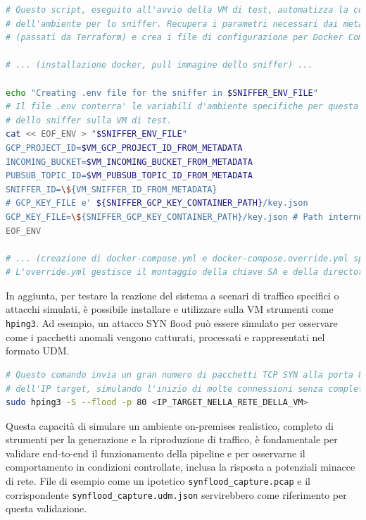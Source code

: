 \documentclass[11pt, a4paper]{article}
\begin{document}
\begin{lstlisting}[language=bash, style=bashstyle, caption={Estratto da \texttt{terraform/modules/test\_generator\_vm/startup\_script\_vm.sh}.}, label=lst:tf_vm_startup, basicstyle=\ttfamily\scriptsize]
# Questo script, eseguito all'avvio della VM di test, automatizza la configurazione
# dell'ambiente per lo sniffer. Recupera i parametri necessari dai metadati dell'istanza
# (passati da Terraform) e crea i file di configurazione per Docker Compose.

# ... (installazione docker, pull immagine dello sniffer) ...

echo "Creating .env file for the sniffer in $SNIFFER_ENV_FILE"
# Il file .env conterra' le variabili d'ambiente specifiche per questa istanza
# dello sniffer sulla VM di test.
cat << EOF_ENV > "$SNIFFER_ENV_FILE"
GCP_PROJECT_ID=$VM_GCP_PROJECT_ID_FROM_METADATA
INCOMING_BUCKET=$VM_INCOMING_BUCKET_FROM_METADATA
PUBSUB_TOPIC_ID=$VM_PUBSUB_TOPIC_ID_FROM_METADATA
SNIFFER_ID=\${VM_SNIFFER_ID_FROM_METADATA}
# GCP_KEY_FILE e' ${SNIFFER_GCP_KEY_CONTAINER_PATH}/key.json
GCP_KEY_FILE=\${SNIFFER_GCP_KEY_CONTAINER_PATH}/key.json # Path interno al container
EOF_ENV

# ... (creazione di docker-compose.yml e docker-compose.override.yml specifici per la VM) ...
# L'override.yml gestisce il montaggio della chiave SA e della directory delle catture.
\end{lstlisting}
In aggiunta, per testare la reazione del sistema a scenari di traffico specifici o attacchi simulati, è possibile installare e utilizzare sulla VM strumenti come \texttt{hping3}. Ad esempio, un attacco SYN flood può essere simulato per osservare come i pacchetti anomali vengono catturati, processati e rappresentati nel formato UDM.
\begin{lstlisting}[language=bash, style=bashstyle, caption={Esempio di comando \texttt{hping3} per simulare un SYN flood (da eseguire sulla VM di test)}, label=lst:hping3_example, basicstyle=\ttfamily\scriptsize]
# Questo comando invia un gran numero di pacchetti TCP SYN alla porta 80
# dell'IP target, simulando l'inizio di molte connessioni senza completarle.
sudo hping3 -S --flood -p 80 <IP_TARGET_NELLA_RETE_DELLA_VM>
\end{lstlisting} 

Questa capacità di simulare un ambiente on-premises realistico, completo di strumenti per la generazione e la riproduzione di traffico, è fondamentale per validare end-to-end il funzionamento della pipeline e per osservarne il comportamento in condizioni controllate, inclusa la risposta a potenziali minacce di rete. File di esempio come un ipotetico \texttt{synflood\_capture.pcap} e il corrispondente \texttt{synflood\_capture.udm.json} servirebbero come riferimento per questa validazione.
\end{document}
